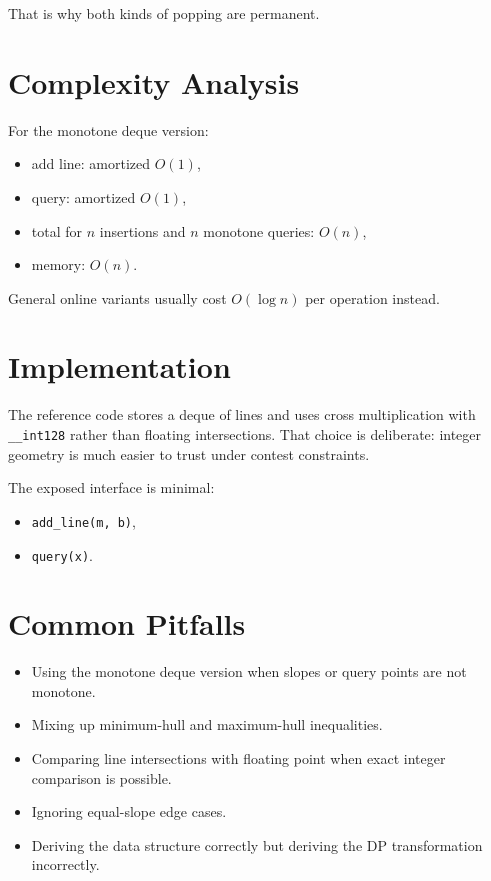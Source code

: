 That is why both kinds of popping are permanent.

\section*{Complexity Analysis}

For the monotone deque version:

\begin{itemize}
  \item add line: amortized \(O(1)\),
  \item query: amortized \(O(1)\),
  \item total for \(n\) insertions and \(n\) monotone queries: \(O(n)\),
  \item memory: \(O(n)\).
\end{itemize}

General online variants usually cost \(O(\log n)\) per operation instead.

\section*{Implementation}

The reference code stores a deque of lines and uses cross multiplication with \texttt{\_\_int128} rather than floating
intersections. That choice is deliberate: integer geometry is much easier to trust under contest constraints.

The exposed interface is minimal:

\begin{itemize}
  \item \texttt{add\_line(m, b)},
  \item \texttt{query(x)}.
\end{itemize}

\section*{Common Pitfalls}

\begin{itemize}
  \item Using the monotone deque version when slopes or query points are not monotone.
  \item Mixing up minimum-hull and maximum-hull inequalities.
  \item Comparing line intersections with floating point when exact integer comparison is possible.
  \item Ignoring equal-slope edge cases.
  \item Deriving the data structure correctly but deriving the DP transformation incorrectly.
\end{itemize}

